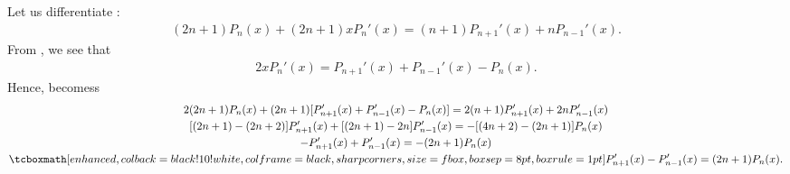 \def\duedate{11/12/22}
\def\HWnum{9}



    

Let us differentiate :
\begin{eqnarray}
    \label{eq:diff-recurrence-7}
    (2n+1)P_{n}(x) + (2n+1)xP_{n}'(x) = (n+1)P_{n+1}'(x) + nP_{n-1}'(x)
.\end{eqnarray}
From , we see that
\begin{eqnarray}
    \label{eq:rewrite-recurrence-8}
    2xP_{n}'(x) = P_{n+1}'(x) + P_{n-1}'(x) - P_{n}(x) 
.\end{eqnarray}
Hence,  becomess
\begin{gather}
\label{eq:final-recurrence}
    2(2n+1)P_{n}(x) + (2n+1)[P_{n+1}'(x) + P_{n-1}'(x) - P_{n}(x)] = 2(n+1)P_{n+1}'(x) + 2nP_{n-1}'(x) \notag \\
    [(2n+1) - (2n+2)]P_{n+1}'(x) + [(2n+1) - 2n]P_{n-1}'(x) = -[(4n+2) - (2n+1)]P_{n}(x) \notag \\
    -P_{n+1}'(x) + P_{n-1}'(x) = -(2n + 1)P_{n}(x) \notag \\
    \eqbox{P_{n+1}'(x) - P_{n-1}'(x) = (2n+1)P_{n}(x)}
.\end{gather}





